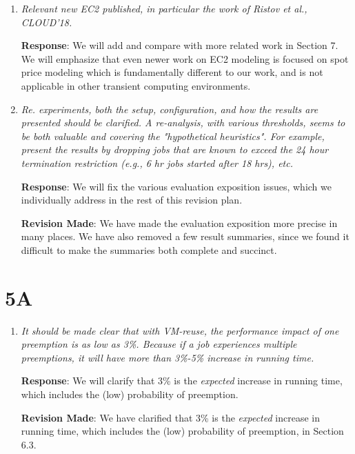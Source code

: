 \documentclass{article}
\newcommand{\resp}[1]{\textbf{Response}: #1}
\newcommand{\revmade}[1]{\textbf{Revision Made}: #1}
\begin{document}
\begin{enumerate}

\item \emph{Relevant new EC2 published, in particular the work of Ristov et al., CLOUD'18.}

\resp{We will add and compare with more related work in Section 7. We will emphasize that even newer work on EC2 modeling is focused on spot price modeling which is fundamentally different to our work, and is not applicable in other transient computing environments.}


\item \emph{Re. experiments, both the setup, configuration, and how the results are presented should be clarified. A re-analysis, with various thresholds, seems to be both valuable and covering the "hypothetical heuristics". For example, present the results by dropping jobs that are known to exceed the 24 hour termination restriction (e.g., 6 hr jobs started after 18 hrs), etc.}

\resp{We will fix the various evaluation exposition issues, which we individually address in the rest of this revision plan.}

\revmade{We have made the evaluation exposition more precise in many places. We have also removed a few result summaries, since we found it difficult to make the summaries both complete and succinct.} 


\end{enumerate}


\section{5A}

\begin{enumerate}

\item \emph{It should be made clear that with VM-reuse, the performance impact of one preemption is as low as 3\%. Because if a job experiences multiple preemptions, it will have more than 3\%-5\% increase in running time.}

\resp{We will clarify that 3\% is the \emph{expected} increase in running time, which includes the (low) probability of preemption.  }

\revmade{We have clarified that 3\% is the \emph{expected} increase in running time, which includes the (low) probability of preemption, in Section 6.3. }

\end{enumerate}
\end{document}

